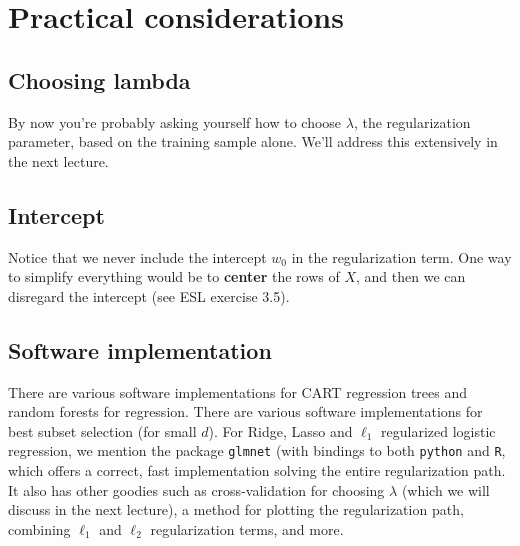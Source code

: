 \section{Practical considerations}

\subsection{Choosing lambda}

By now you're probably asking yourself how to choose $\lambda$, the
regularization parameter, based on the training sample alone. We'll address this
extensively in the next lecture.

\subsection{Intercept}

Notice that we never include the intercept $w_0$ in the regularization term. One
way to simplify everything would be to {\bf center} the rows of $X$, and then we
can disregard the intercept (see ESL exercise 3.5).

\subsection{Software implementation}

There are various software implementations for CART regression trees and random
forests for regression. There are various software implementations for best
subset selection (for small $d$).
For Ridge, Lasso and $\ell_1$ regularized logistic regression, we mention the
package 
{\tt glmnet} (with bindings to both {\tt python} and {\tt R}, which offers a correct, fast implementation solving the entire
regularization path. It also has other goodies such as cross-validation for
choosing $\lambda$ (which we will discuss in the next lecture), a method for
plotting the regularization path, combining $\ell_1$ and $\ell_2$
regularization terms, and more.





